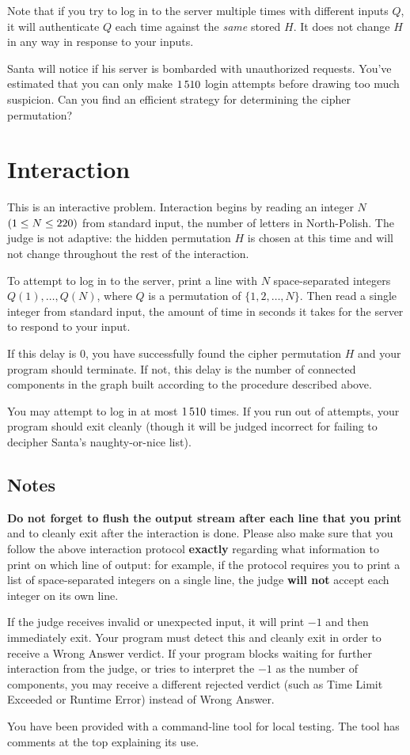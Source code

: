 Note that if you try to log in to the server multiple times with different inputs $Q$, it will authenticate $Q$ each time against the \emph{same} stored $H$. It does not change $H$ in any way in response to your inputs.

Santa will notice if his server is bombarded with unauthorized requests. You've estimated that you can only make $1\,510$ login attempts before drawing too much suspicion. Can you find an efficient strategy for determining the cipher permutation?

\section*{Interaction}
This is an interactive problem. Interaction begins by reading an integer $N$ $(1 \leq N \leq 220)$ from standard input, the number of letters in North-Polish. The judge is not adaptive: the hidden permutation $H$ is chosen at this time and will not change throughout the rest of the interaction.

To attempt to log in to the server, print a line with $N$ space-separated integers $Q(1), \ldots, Q(N)$, where $Q$ is a permutation of $\{1, 2, \ldots, N\}$. Then read a single integer from standard input, the amount of time in seconds it takes for the server to respond to your input.

If this delay is $0$, you have successfully found the cipher permutation $H$ and your program should terminate. If not, this delay is the number of connected components in the graph built according to the procedure described above.

You may attempt to log in at most $1\,510$ times. If you run out of attempts, your program should exit cleanly (though it will be judged incorrect for failing to decipher Santa's naughty-or-nice list).

\subsection*{Notes}

\textbf{Do not forget to flush the output stream after each line that you print} and to cleanly exit after the interaction is done. Please also make sure that you follow the above interaction protocol \textbf{exactly} regarding what information to print on which line of output: for example, if the protocol requires you to print a list of space-separated integers on a single line, the judge \textbf{will not} accept each integer on its own line.

If the judge receives invalid or unexpected input, it will print $-1$ and then immediately exit. Your program must detect this and cleanly exit in order to receive a Wrong Answer verdict. If your program blocks waiting for further interaction from the judge, or tries to interpret the $-1$ as the number of components, you may receive a different rejected verdict (such as Time Limit Exceeded or Runtime Error) instead of Wrong Answer.

You have been provided with a command-line tool for local testing. The tool has comments at the top explaining its use.